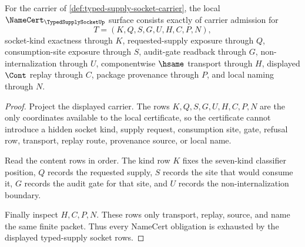 \begin{theorem}
\label{thm:typed-supply-socket-namecert-obligations}
For the carrier of \autoref{def:typed-supply-socket-carrier}, the local $\NameCert_{\TypedSupplySocketUp}$ surface consists exactly of carrier admission for
$$
T=(K,Q,S,G,U,H,C,P,N),
$$
socket-kind exactness through $K$, requested-supply exposure through $Q$, consumption-site exposure through $S$, audit-gate readback through $G$, non-internalization through $U$, componentwise $\hsame$ transport through $H$, displayed $\Cont$ replay through $C$, package provenance through $P$, and local naming through $N$.
\end{theorem}
\begin{proof}
Project the displayed carrier. The rows $K,Q,S,G,U,H,C,P,N$ are the only coordinates available to the local certificate, so the certificate cannot introduce a hidden socket kind, supply request, consumption site, gate, refusal row, transport, replay route, provenance source, or local name.

Read the content rows in order. The kind row $K$ fixes the seven-kind classifier position, $Q$ records the requested supply, $S$ records the site that would consume it, $G$ records the audit gate for that site, and $U$ records the non-internalization boundary.

Finally inspect $H,C,P,N$. These rows only transport, replay, source, and name the same finite packet. Thus every NameCert obligation is exhausted by the displayed typed-supply socket rows.
\end{proof}

